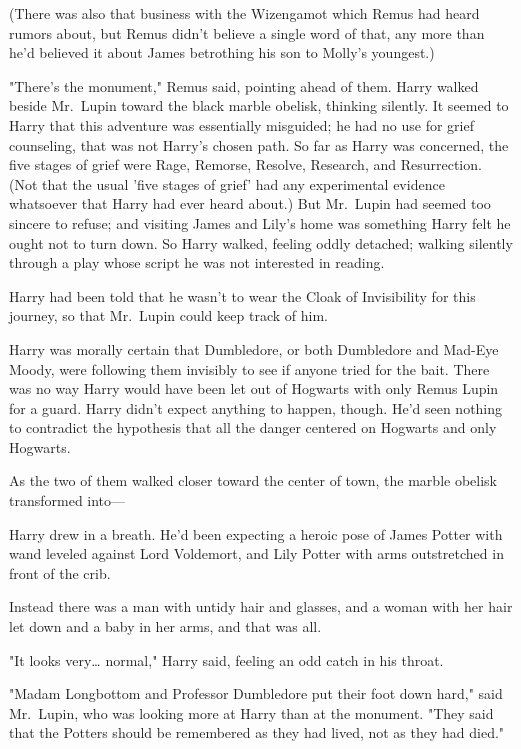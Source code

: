 (There was also that business with the Wizengamot which Remus had heard rumors 
about, but Remus didn't believe a single word of that, any more than he'd 
believed it about James betrothing his son to Molly's youngest.)

"There's the monument," Remus said, pointing ahead of them.
\sbreak
Harry walked beside Mr.~Lupin toward the black marble obelisk, thinking 
silently. It seemed to Harry that this adventure was essentially misguided; he 
had no use for grief counseling, that was not Harry's chosen path. So far as 
Harry was concerned, the five stages of grief were Rage, Remorse, Resolve, 
Research, and Resurrection. (Not that the usual 'five stages of grief' had any 
experimental evidence whatsoever that Harry had ever heard about.) But 
Mr.~Lupin had seemed too sincere to refuse; and visiting James and Lily's home 
was something Harry felt he ought not to turn down. So Harry walked, feeling 
oddly detached; walking silently through a play whose script he was not 
interested in reading.

Harry had been told that he wasn't to wear the Cloak of Invisibility for this 
journey, so that Mr.~Lupin could keep track of him.

Harry was morally certain that Dumbledore, or both Dumbledore and Mad-Eye 
Moody, were following them invisibly to see if anyone tried for the bait. There 
was no way Harry would have been let out of Hogwarts with only Remus Lupin for 
a guard. Harry didn't expect anything to happen, though. He'd seen nothing to 
contradict the hypothesis that all the danger centered on Hogwarts and only 
Hogwarts.

As the two of them walked closer toward the center of town, the marble obelisk 
transformed into---

Harry drew in a breath. He'd been expecting a heroic pose of James Potter with 
wand leveled against Lord Voldemort, and Lily Potter with arms outstretched in 
front of the crib.

Instead there was a man with untidy hair and glasses, and a woman with her hair 
let down and a baby in her arms, and that was all.

"It looks very{\ldots} normal," Harry said, feeling an odd catch in his throat.

"Madam Longbottom and Professor Dumbledore put their foot down hard," said 
Mr.~Lupin, who was looking more at Harry than at the monument. "They said that 
the Potters should be remembered as they had lived, not as they had died."

